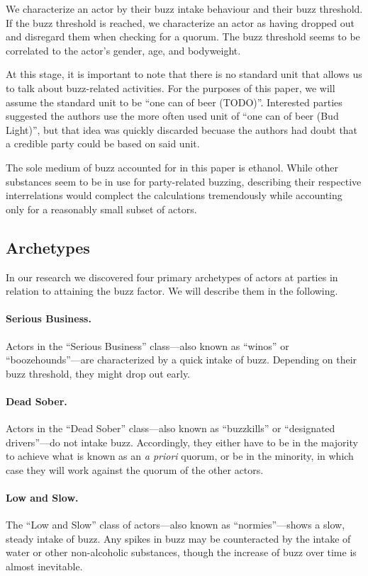 \documentclass[twocolumn]{article}
\begin{document}
We characterize an actor by their buzz intake behaviour and their buzz
threshold. If the buzz threshold is reached, we characterize an actor as having
dropped out and disregard them when checking for a quorum. The buzz threshold
seems to be correlated to the actor’s gender, age, and bodyweight.

At this stage, it is important to note that there is no standard unit that
allows us to talk about buzz-related activities. For the purposes of this paper,
we will assume the standard unit to be “one can of beer (TODO)”. Interested
parties suggested the authors use the more often used unit of “one can of beer
(Bud Light)”, but that idea was quickly discarded becuase the authors had doubt
that a credible party could be based on said unit.

The sole medium of buzz accounted for in this paper is ethanol. While other
substances seem to be in use for party-related buzzing, describing their
respective interrelations would complect the calculations tremendously while
accounting only for a reasonably small subset of actors.

\subsection{Archetypes}

In our research we discovered four primary archetypes of actors at parties in
relation to attaining the buzz factor. We will describe them in the following.

\paragraph{Serious Business.} Actors in the “Serious Business” class—also known
as “winos” or “boozehounds”—are characterized by a quick intake of buzz.
Depending on their buzz threshold, they might drop out early.

\paragraph{Dead Sober.} Actors in the “Dead Sober” class—also known as
“buzzkills” or “designated drivers”—do not intake buzz. Accordingly, they either
have to be in the majority to achieve what is known as an \textit{a priori}
quorum, or be in the minority, in which case they will work against the quorum
of the other actors.

\paragraph{Low and Slow.} The “Low and Slow” class of actors—also known as
“normies”—shows a slow, steady intake of buzz. Any spikes in buzz may be
counteracted by the intake of water or other non-alcoholic substances, though
the increase of buzz over time is almost inevitable.
\end{document}

